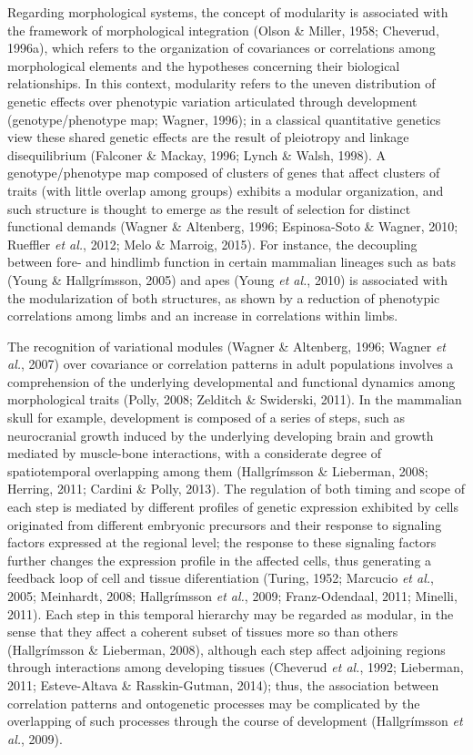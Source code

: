 \documentclass[12pt,twoside]{report}
\begin{document}
Regarding morphological systems, the concept of modularity is associated
with the framework of morphological integration (Olson \& Miller, 1958;
Cheverud, 1996a), which refers to the organization of covariances or
correlations among morphological elements and the hypotheses concerning
their biological relationships. In this context, modularity refers to
the uneven distribution of genetic effects over phenotypic variation
articulated through development (genotype/phenotype map; Wagner, 1996);
in a classical quantitative genetics view these shared genetic effects
are the result of pleiotropy and linkage disequilibrium (Falconer \&
Mackay, 1996; Lynch \& Walsh, 1998). A genotype/phenotype map composed
of clusters of genes that affect clusters of traits (with little overlap
among groups) exhibits a modular organization, and such structure is
thought to emerge as the result of selection for distinct functional
demands (Wagner \& Altenberg, 1996; Espinosa-Soto \& Wagner, 2010;
Rueffler \emph{et al.}, 2012; Melo \& Marroig, 2015). For instance, the
decoupling between fore- and hindlimb function in certain mammalian
lineages such as bats (Young \& Hallgrímsson, 2005) and apes (Young
\emph{et al.}, 2010) is associated with the modularization of both
structures, as shown by a reduction of phenotypic correlations among
limbs and an increase in correlations within limbs.

The recognition of variational modules (Wagner \& Altenberg, 1996;
Wagner \emph{et al.}, 2007) over covariance or correlation patterns in
adult populations involves a comprehension of the underlying
developmental and functional dynamics among morphological traits (Polly,
2008; Zelditch \& Swiderski, 2011). In the mammalian skull for example,
development is composed of a series of steps, such as neurocranial
growth induced by the underlying developing brain and growth mediated by
muscle-bone interactions, with a considerate degree of spatiotemporal
overlapping among them (Hallgrímsson \& Lieberman, 2008; Herring, 2011;
Cardini \& Polly, 2013). The regulation of both timing and scope of each
step is mediated by different profiles of genetic expression exhibited
by cells originated from different embryonic precursors and their
response to signaling factors expressed at the regional level; the
response to these signaling factors further changes the expression
profile in the affected cells, thus generating a feedback loop of cell
and tissue diferentiation (Turing, 1952; Marcucio \emph{et al.}, 2005;
Meinhardt, 2008; Hallgrímsson \emph{et al.}, 2009; Franz-Odendaal, 2011;
Minelli, 2011). Each step in this temporal hierarchy may be regarded as
modular, in the sense that they affect a coherent subset of tissues more
so than others (Hallgrímsson \& Lieberman, 2008), although each step
affect adjoining regions through interactions among developing tissues
(Cheverud \emph{et al.}, 1992; Lieberman, 2011; Esteve-Altava \&
Rasskin-Gutman, 2014); thus, the association between correlation
patterns and ontogenetic processes may be complicated by the overlapping
of such processes through the course of development (Hallgrímsson
\emph{et al.}, 2009).
\end{document}
